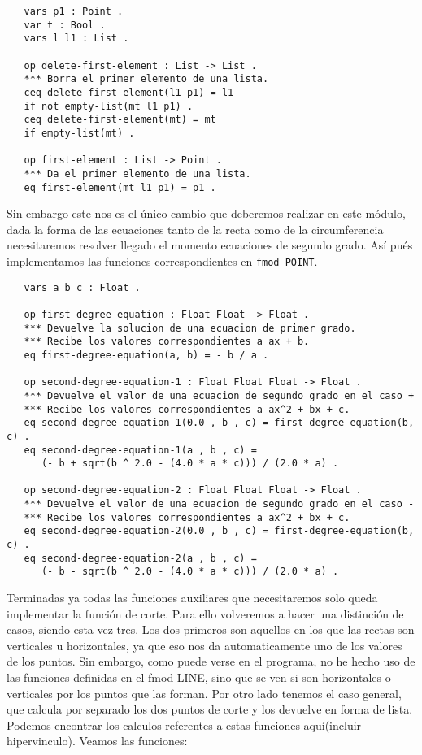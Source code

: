 {\codesize
\begin{verbatim}
   vars p1 : Point .
   var t : Bool .
   vars l l1 : List .

   op delete-first-element : List -> List .
   *** Borra el primer elemento de una lista.
   ceq delete-first-element(l1 p1) = l1
   if not empty-list(mt l1 p1) .
   ceq delete-first-element(mt) = mt
   if empty-list(mt) .

   op first-element : List -> Point .
   *** Da el primer elemento de una lista.
   eq first-element(mt l1 p1) = p1 .
\end{verbatim}

Sin embargo este nos es el único cambio que deberemos realizar en este módulo, dada la forma de las ecuaciones tanto de la recta como de la circumferencia necesitaremos resolver llegado el momento ecuaciones de segundo grado. Así pués implementamos las funciones correspondientes en \texttt{fmod POINT}. \par

{\codesize
\begin{verbatim}
   vars a b c : Float .

   op first-degree-equation : Float Float -> Float .
   *** Devuelve la solucion de una ecuacion de primer grado.
   *** Recibe los valores correspondientes a ax + b.
   eq first-degree-equation(a, b) = - b / a .

   op second-degree-equation-1 : Float Float Float -> Float .
   *** Devuelve el valor de una ecuacion de segundo grado en el caso +
   *** Recibe los valores correspondientes a ax^2 + bx + c.
   eq second-degree-equation-1(0.0 , b , c) = first-degree-equation(b, c) .
   eq second-degree-equation-1(a , b , c) = 
      (- b + sqrt(b ^ 2.0 - (4.0 * a * c))) / (2.0 * a) . 

   op second-degree-equation-2 : Float Float Float -> Float .
   *** Devuelve el valor de una ecuacion de segundo grado en el caso -
   *** Recibe los valores correspondientes a ax^2 + bx + c.
   eq second-degree-equation-2(0.0 , b , c) = first-degree-equation(b, c) .
   eq second-degree-equation-2(a , b , c) = 
      (- b - sqrt(b ^ 2.0 - (4.0 * a * c))) / (2.0 * a) .
\end{verbatim}
}

Terminadas ya todas las funciones auxiliares que necesitaremos solo queda implementar la función de corte. Para ello volveremos a hacer una distinción de casos, siendo esta vez tres. Los dos primeros son aquellos en los que las rectas son verticales u horizontales, ya que eso nos da automaticamente uno de los valores de los puntos. Sin embargo, como puede verse en el programa, no he hecho uso de las funciones definidas en el fmod LINE, sino que se ven si son horizontales o verticales por los puntos que las forman. Por otro lado tenemos el caso general, que calcula por separado los dos puntos de corte y los devuelve en forma de lista. Podemos encontrar los calculos referentes a estas funciones aquí(incluir hipervinculo). Veamos las funciones:

}

